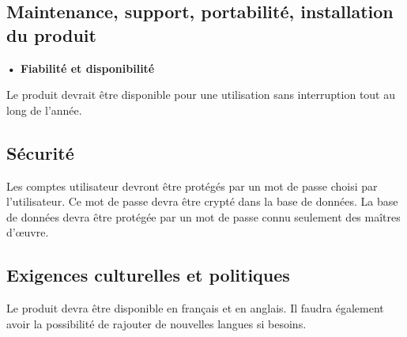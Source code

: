\documentclass[a4paper,12pt]{article}
\begin{document}
\subsection{Maintenance, support, portabilité, installation du produit}

\textbf{• Fiabilité et disponibilité}

Le produit devrait être disponible pour une utilisation sans interruption tout au long de l’année.

\subsection{Sécurité}

Les comptes utilisateur devront être protégés par un mot de passe choisi par l’utilisateur. Ce mot de passe devra être crypté dans la base de données.
La base de données devra être protégée par un mot de passe connu seulement des maîtres d’œuvre.

\subsection{Exigences culturelles et politiques}

Le produit devra être disponible en français et en anglais. Il faudra également avoir la possibilité de rajouter de nouvelles langues si besoins.
\end{document}
